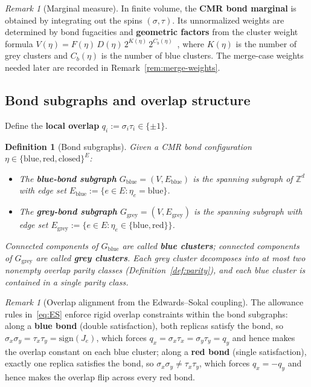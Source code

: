 \documentclass[11pt]{article}
\newtheorem{definition}[theorem]{Definition}
\numberwithin{theorem}{section}
\theoremstyle{remark}
\newtheorem{remark}[theorem]{Remark}
\begin{document}
\begin{remark}[Marginal measure]\label{rem:weights}
In finite volume, the \textbf{CMR bond marginal} is obtained by integrating out the spins $(\sigma, \tau)$. Its unnormalized weights are determined by bond fugacities and \textbf{geometric factors} from the cluster weight formula $V(\eta) = F(\eta)\,D(\eta)\,2^{K(\eta)}\,2^{C_b(\eta)}$~\cite[eq.~(9)]{CMR1998theory}, where $K(\eta)$ is the number of grey clusters and $C_b(\eta)$ is the number of blue clusters. The merge-case weights needed later are recorded in Remark~\ref{rem:merge-weights}.
\end{remark}

\subsection{Bond subgraphs and overlap structure}

Define the \textbf{local overlap} $q_i := \sigma_i \tau_i \in \{\pm 1\}$.

\begin{definition}[Bond subgraphs]\label{def:subgraphs}
Given a CMR bond configuration $\eta \in \{\text{blue}, \text{red}, \text{closed}\}^E$:
\begin{itemize}
\item The \textbf{blue-bond subgraph} $G_{\mathrm{blue}} = (V, E_{\mathrm{blue}})$ is the spanning subgraph of $\mathbb{Z}^d$ with edge set $E_{\mathrm{blue}} := \{e \in E : \eta_e = \text{blue}\}$.
\item The \textbf{grey-bond subgraph} $G_{\mathrm{grey}} = (V, E_{\mathrm{grey}})$ is the spanning subgraph with edge set $E_{\mathrm{grey}} := \{e \in E : \eta_e \in \{\text{blue}, \text{red}\}\}$.
\end{itemize}
Connected components of $G_{\mathrm{blue}}$ are called \textbf{blue clusters}; connected components of $G_{\mathrm{grey}}$ are called \textbf{grey clusters}.
Each grey cluster decomposes into at most two nonempty overlap parity classes (Definition~\ref{def:parity}), and each blue cluster is contained in a single parity class.
\end{definition}

\begin{remark}[Overlap alignment from the Edwards--Sokal coupling]
The allowance rules in~\eqref{eq:ES} enforce rigid overlap constraints within the bond subgraphs: along a \textbf{blue bond} (double satisfaction), both replicas satisfy the bond, so $\sigma_x \sigma_y = \tau_x \tau_y = \mathrm{sign}(J_e)$, which forces $q_x = \sigma_x \tau_x = \sigma_y \tau_y = q_y$ and hence makes the overlap constant on each blue cluster; along a \textbf{red bond} (single satisfaction), exactly one replica satisfies the bond, so $\sigma_x \sigma_y \neq \tau_x \tau_y$, which forces $q_x = -q_y$ and hence makes the overlap flip across every red bond.
\end{remark}
\end{document}
